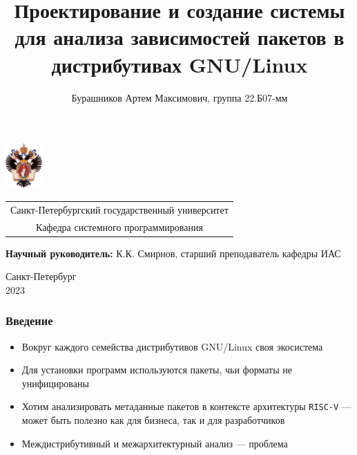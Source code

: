 \documentclass{beamer}
\title[Метаданные пакетов в Linux]{Проектирование и создание системы для анализа зависимостей пакетов в дистрибутивах GNU/Linux}
\institute[СПбГУ]{}
\author[Бурашников Артем]{Бурашников Артем Максимович, группа 22.Б07-мм}
\begin{document}
{
\begin{frame}
	\includegraphics[width=1.4cm]{pictures/SPbGU_Logo.png}
	\vspace{-35pt}
	\hspace{-10pt}
	\begin{center}
		\begin{tabular}{c}
			\scriptsize{Санкт-Петербургский государственный университет} \\
			\scriptsize{Кафедра системного программирования}
		\end{tabular}
		\titlepage
	\end{center}

	\btVFill

	{\scriptsize
		\textbf{Научный руководитель:} К.К. Смирнов, старший преподаватель кафедры ИАС \\
	}
	\begin{center}
		\vspace{5pt}
		\scriptsize{Санкт-Петербург\\
			2023}
	\end{center}

\end{frame}
}

\begin{frame}[fragile]
	\frametitle{Введение}
	\begin{itemize}
		\item Вокруг каждого семейства дистрибутивов GNU/Linux своя экосистема
		\item Для установки программ используются пакеты, чьи форматы не унифицированы
		\item Хотим анализировать метаданные пакетов в контексте архитектуры \texttt{RISC-V} --- может быть полезно как для бизнеса, так и для разработчиков
		\item Междистрибутивный и межархитектурный анализ --- проблема
	\end{itemize}
\end{frame}
\end{document}
